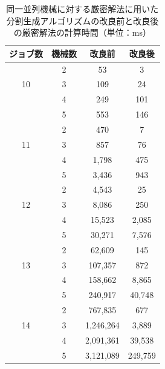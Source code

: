 \documentclass[12pt]{optlab-bachelor}
\begin{document}
\begin{table}[htb]
  \begin{center}
    \begin{tabular}{|c|c|c|c|} \hline
      ジョブ数 & 機械数 & 改良前 & 改良後 \\ \hline \hline
      & 2 & 53 & 3  \\ \cline{2-4}
      10 & 3 & 109 & 24  \\ \cline{2-4}
      & 4 & 249 & 101  \\ \cline{2-4}
      & 5 & 553 & 146  \\ \hline \hline
      & 2 & 470 & 7  \\ \cline{2-4}
      11 & 3 & 857 & 76 \\ \cline{2-4}
      & 4 & 1,798 & 475  \\ \cline{2-4}
      & 5 & 3,436 & 943  \\ \hline \hline
      & 2 & 4,543 & 25  \\ \cline{2-4}
      12 & 3 & 8,086 & 250  \\ \cline{2-4}
      & 4 & 15,523 & 2,085 \\ \cline{2-4}
      & 5 & 30,271 & 7,576   \\ \hline \hline
      & 2 & 62,609 & 145 \\ \cline{2-4}
      13 & 3 & 107,357 & 872 \\ \cline{2-4}
      & 4 & 158,662 & 8,865 \\ \cline{2-4}
      & 5 & 240,917 & 40,748 \\ \hline \hline
      & 2 & 767,835 & 677 \\ \cline{2-4}
      14 & 3 & 1,246,264 & 3,889 \\ \cline{2-4}
      & 4 & 2,091,361 & 39,538 \\ \cline{2-4}
      & 5 & 3,121,089 & 249,759  \\ \hline \hline
    \end{tabular}
    \caption{同一並列機械に対する厳密解法に用いた分割生成アルゴリズムの改良前と改良後の厳密解法の計算時間（単位：ms）}
    \label{A1}
  \end{center}
\end{table}
\end{document}
